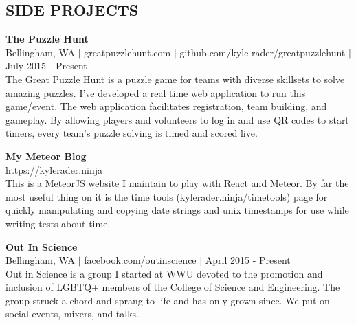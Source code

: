 \documentclass[line,margin]{res}
\begin{document}
\begin{resume}


\newpage

\section{SIDE PROJECTS}
    {\bf The Puzzle Hunt} \\
    {\footnotesize Bellingham, WA $|$ greatpuzzlehunt.com $|$ github.com/kyle-rader/greatpuzzlehunt $|$ July 2015 - Present} \\
    The Great Puzzle Hunt is a puzzle game for teams with diverse skillsets to solve amazing puzzles.
    I've developed a real time web application to run this game/event. The web application facilitates registration, team building, and gameplay.
    By allowing players and volunteers to log in and use QR codes to start timers, every team's puzzle solving is timed and scored live.

    {\bf My Meteor Blog} \\
    {\footnotesize https://kylerader.ninja} \\
    This is a MeteorJS website I maintain to play with React and Meteor.  By far the most useful thing on it
    is the time tools (kylerader.ninja/timetools) page for quickly manipulating and copying date strings and unix timestamps for use while
    writing tests about time.

    {\bf Out In Science} \\
    {\footnotesize Bellingham, WA $|$ facebook.com/outinscience $|$ April 2015 - Present} \\
    Out in Science is a group I started at WWU devoted to the promotion and inclusion of LGBTQ+ members of the College of Science and Engineering.
    The group struck a chord and sprang to life and has only grown since.  We put on social events, mixers, and talks.


\end{resume}
\end{document}
